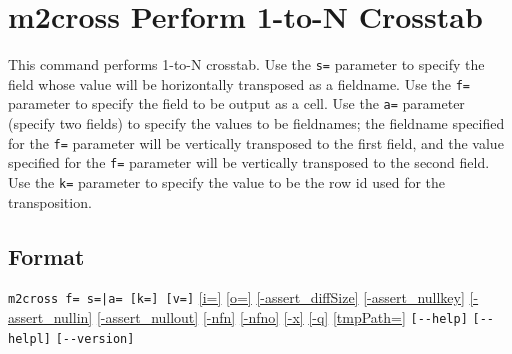%

\section{m2cross Perform 1-to-N Crosstab\label{sect:mcross}}
This command performs 1-to-N crosstab.
Use the \verb|s=| parameter to specify the field whose value will be horizontally transposed as a fieldname. Use the \verb|f=| parameter to specify the field to be output as a cell. Use the \verb|a=| parameter (specify two fields) to specify the values to be fieldnames; the fieldname specified for the \verb|f=| parameter will be vertically transposed to the first field, and the value specified for the \verb|f=| parameter will be vertically transposed to the second field. Use the \verb|k=| parameter to specify the value to be the row id used for the transposition.

\subsection*{Format}
\verb/m2cross f= s=|a= [k=] [v=]/
\hyperref[sect:option_i]{[i=]}
\hyperref[sect:option_o]{[o=]}
\hyperref[sect:option_assert_diffSize]{[-assert\_diffSize]}
\hyperref[sect:option_assert_nullkey]{[-assert\_nullkey]}
\hyperref[sect:option_assert_nullin]{[-assert\_nullin]}
\hyperref[sect:option_assert_nullout]{[-assert\_nullout]}
\hyperref[sect:option_nfn]{[-nfn]} 
\hyperref[sect:option_nfno]{[-nfno]}  
\hyperref[sect:option_x]{[-x]}
\hyperref[sect:option_q]{[-q]}
\hyperref[sect:option_option_tmppath]{[tmpPath=]}
\verb|[--help]|
\verb|[--helpl]|
\verb|[--version]|\\

